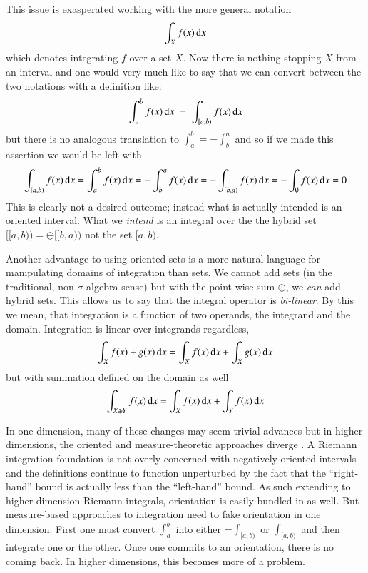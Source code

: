 This issue is exasperated working with the more general notation
\begin{equation*}
	\int_X f(x) \mathop{}\!\mathrm{d} x
\end{equation*}
which denotes integrating $f$ over a set $X$.
Now there is nothing stopping $X$ from an interval and one would very much like to say that we can convert between the
two notations with a definition like:
\begin{equation*}
	\int_a^b f(x) \mathop{}\!\mathrm{d} x \;=\; \int_{[a,b)} f(x) \mathop{}\!\mathrm{d} x
\end{equation*}
but there is no analogous translation to $\int_a^b = - \int_b^a$ and so if we made this assertion we would be left with
\begin{equation*}
	\int_{[a,b)} f(x) \mathop{}\!\mathrm{d} x 
		= \int_a^b f(x) \mathop{}\!\mathrm{d} x 
		= -\int_b^a f(x) \mathop{}\!\mathrm{d} x 
		= - \int_{[b,a)} f(x)\mathop{}\!\mathrm{d} x 
		= -\int_\emptyset f(x)\mathop{}\!\mathrm{d} x 	
		= 0
\end{equation*}
This is clearly not a desired outcome; instead what is actually intended is an oriented interval.
What we \emph{intend} is an integral over the the hybrid set $[\![a,b)\!)=\ominus[\![b,a)\!)$ not the set $[a,b)$.



Another advantage to using oriented sets is a more natural language for manipulating domains of integration than sets.
We cannot add sets (in the traditional, non-$\sigma$-algebra sense) 
but with the point-wise sum $\oplus$, we \emph{can} add hybrid sets.
This allows us to say that the integral operator is \emph{bi-linear}.
By this we mean, that integration is a function of two operands, the integrand and the domain.
Integration is linear over integrands regardless,
\begin{equation*}
	\int_{X} f(x) + g(x) \mathop{}\!\mathrm{d} x = \int_X f(x) \mathop{}\!\mathrm{d} x + \int_X g(x) \mathop{}\!\mathrm{d} x
\end{equation*}
but with summation defined on the domain as well
\begin{equation*}
	\int_{X\oplus Y} f(x) \mathop{}\!\mathrm{d} x = \int_{X} f(x) \mathop{}\!\mathrm{d} x + \int_Y f(x) \mathop{}\!\mathrm{d} x
\end{equation*}


In one dimension, many of these changes may seem trivial advances but in higher dimensions, 
the oriented and measure-theoretic approaches diverge \cite{tao2007differential}.
A Riemann integration foundation is not overly concerned with negatively oriented intervals and the definitions continue
to function unperturbed by the fact that the ``right-hand'' bound is actually less than the ``left-hand'' bound.
As such extending to higher dimension Riemann integrals, orientation is easily bundled in as well.
But measure-based approaches to integration need to fake orientation in one dimension.
First one must convert $\int_a^b$ into either $-\int_{[a,b)}$ or $\int_{[a,b)}$ and then integrate one or the other.
Once one commits to an orientation, there is no coming back.
In higher dimensions, this becomes more of a problem.

